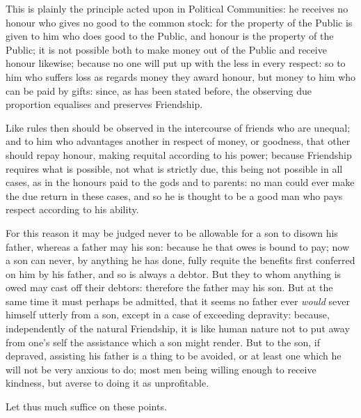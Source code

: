 This is plainly the principle acted upon in Political Communities: he receives
no honour who gives no good to the common stock: for the property of the Public
is given to him who does good to the Public, and honour is the property of the
Public; it is not possible both to make money out of the Public and receive
honour likewise; because no one will put up with the less in every respect: so
to him who suffers loss as regards money they award honour, but money to him
who can be paid by gifts: since, as has been stated before, the observing due
proportion equalises and preserves Friendship.

Like rules then should be observed in the intercourse of friends who are
unequal; and to him who advantages another in respect of money, or goodness,
that other should repay honour, making requital according to his power; because
Friendship requires what is possible, not what is strictly due, this being not
possible in all cases, as in the honours paid to the gods and to parents: no
man could ever make the due return in these cases, and so he is thought to be a
good man who pays respect according to his ability.

For this reason it may be judged never to be allowable for a son to disown his
father, whereas a father may his son: because he that owes is bound to pay; now
a son can never, by anything he has done, fully requite the benefits first
conferred on him by his father, and so is always a debtor. But they to whom
anything is owed may cast off their debtors: therefore the father may his son.
But at the same time it must perhaps be admitted, that it seems no father ever
\emph{would} sever himself utterly from a son, except in a case of exceeding
depravity: because, independently of the natural Friendship, it is like human
nature not to put away from one’s self the assistance which a son might
render. But to the son, if depraved, assisting his father is a thing to be
avoided, or at least one which he will not be very anxious to do; most men
being willing enough to receive kindness, but averse to doing it as
unprofitable.

Let thus much suffice on these points.



